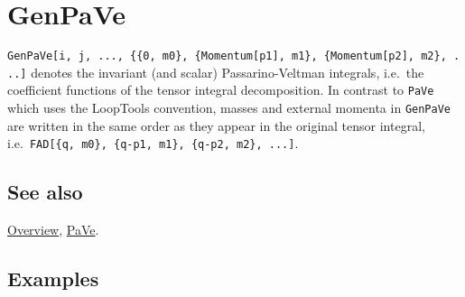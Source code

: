 \documentclass[../FeynCalcManual.tex]{subfiles}
\begin{document}
\hypertarget{genpave}{%
\section{GenPaVe}\label{genpave}}

\texttt{GenPaVe[\allowbreak{}i,\ \allowbreak{}j,\ \allowbreak{}...,\ \allowbreak{}\{\allowbreak{}\{\allowbreak{}0,\ \allowbreak{}m0\},\ \allowbreak{}\{\allowbreak{}Momentum[\allowbreak{}p1],\ \allowbreak{}m1\},\ \allowbreak{}\{\allowbreak{}Momentum[\allowbreak{}p2],\ \allowbreak{}m2\},\ \allowbreak{}...]}
denotes the invariant (and scalar) Passarino-Veltman integrals, i.e.~the
coefficient functions of the tensor integral decomposition. In contrast
to \texttt{PaVe} which uses the LoopTools convention, masses and
external momenta in \texttt{GenPaVe} are written in the same order as
they appear in the original tensor integral,
i.e.~\texttt{FAD[\allowbreak{}\{\allowbreak{}q,\ \allowbreak{}m0\},\ \allowbreak{}\{\allowbreak{}q-p1,\ \allowbreak{}m1\},\ \allowbreak{}\{\allowbreak{}q-p2,\ \allowbreak{}m2\},\ \allowbreak{}...]}.

\subsection{See also}

\hyperlink{toc}{Overview}, \hyperlink{pave}{PaVe}.

\subsection{Examples}

\begin{Shaded}
\begin{Highlighting}[]
\OperatorTok{[}\OperatorTok{,} \SpecialCharTok{\textbackslash{}}\OperatorTok{[}\OperatorTok{]]}\OperatorTok{[}\OperatorTok{,} \SpecialCharTok{\textbackslash{}}\OperatorTok{[}\OperatorTok{]]}\OperatorTok{[\{}\OperatorTok{,}\OperatorTok{\},} \OperatorTok{\{} \SpecialCharTok{+}\OperatorTok{,}\OperatorTok{\},} \OperatorTok{\{} \SpecialCharTok{+}\OperatorTok{,}\OperatorTok{\}]}\SpecialCharTok{/}\NormalTok{(}\SpecialCharTok{*}\SpecialCharTok{\^{}}\NormalTok{) }
 
\OperatorTok{[}\SpecialCharTok{\%}\OperatorTok{,} \OperatorTok{,}\OtherTok{{-}\textgreater{}} \OperatorTok{]} 
 
\OperatorTok{[}\SpecialCharTok{\%\%}\OperatorTok{,} \OperatorTok{,}\OtherTok{{-}\textgreater{}} \OperatorTok{,}\OtherTok{{-}\textgreater{}} \OperatorTok{]}
\end{Highlighting}
\end{Shaded}
\end{document}
